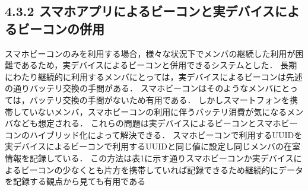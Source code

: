 

\subsection*{4.3.2 スマホアプリによるビーコンと実デバイスによるビーコンの併用}





スマホビーコンのみを利用する場合，様々な状況下でメンバの継続した利用が困難であるため，実デバイスによるビーコンと併用できるシステムとした．
長期にわたり継続的に利用するメンバにとっては，実デバイスによるビーコンは先述の通りバッテリ交換の手間がある．
スマホビーコンはそのようなメンバにとっては，バッテリ交換の手間がないため有用である．
しかしスマートフォンを携帯していないメンバ，スマホビーコンの利用に伴うバッテリ消費が気になるメンバなども想定される．
これらの問題は実デバイスによるビーコンとスマホビーコンのハイブリッド化によって解決できる．
スマホビーコンで利用するUUIDを実デバイスによるビーコンで利用するUUIDと同じ値に設定し同じメンバの在室情報を記録している．
この方法は表1に示す通りスマホビーコンか実デバイスによるビーコンの少なくとも片方を携帯していれば記録できるため継続的にデータを記録する観点から見ても有用である





\begin{table}[tbh]
  \caption{各ビーコンのみ対応時とハイブリッド対応時の比較}
  \label{multipleBPM}
\end{table}
